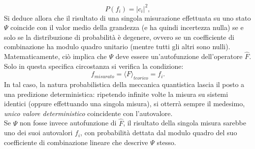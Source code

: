\documentclass[a4paper,11pt]{report}
\begin{document}
\begin{equation}
    P(f_i) = |c_i|^2,
\end{equation} 
Si deduce allora che il risultato di una singola misurazione effettuata su uno stato $\Psi$ coincide con il valor medio della grandezza (e ha quindi incertezza nulla) se e solo se la distribuzione di probabilità è degenere, ovvero se un coefficiente di combinazione ha modulo quadro unitario (mentre tutti gli altri sono nulli).
Matematicamente, ciò implica che $\Psi$ deve essere un'autofunzione dell'operatore $\hat{F}$. Solo in questa specifica circostanza si verifica la condizione:
\begin{equation}
    f_{misurato} = \langle F \rangle_{teorico} = f_i.
\end{equation}
In tal caso, la natura probabilistica della meccanica quantistica lascia il posto a una predizione deterministica: ripetendo infinite volte la misura su sistemi identici (oppure effettuando una singola misura), si otterrà sempre il medesimo, \textit{unico valore deterministico} coincidente con l'autovalore. \\
Se $\Psi$ non fosse invece autofunzione di $\hat{F}$, il risultato della singola misura sarebbe uno dei suoi autovalori $f_i$, con probabilità dettata dal modulo quadro del suo coefficiente di combinazione lineare che descrive $\Psi$ stesso.
\end{document}
